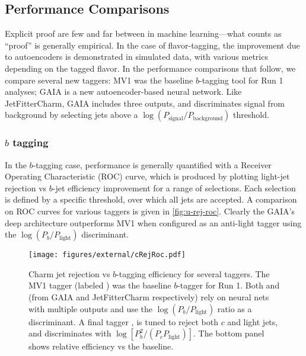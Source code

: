 \subsection{Performance Comparisons}

Explicit proof are few and far between in machine learning---what counts as ``proof'' is generally empirical.
In the case of flavor-tagging, the improvement due to autoencoders is demonstrated in simulated data, with various metrics depending on the tagged flavor.
In the performance comparisons that follow, we compare several new taggers: MV1 was the baseline $b$-tagging tool for Run 1 analyses; GAIA is a new autoencoder-based neural network.
Like JetFitterCharm, GAIA includes three outputs, and discriminates signal from background by selecting jets above a $\log(P_{\text{signal}} / P_{\text{background}})$ threshold.

\subsubsection{$b$ tagging}
In the $b$-tagging case, performance is generally quantified with a Receiver Operating Characteristic (ROC) curve, which is produced by plotting light-jet rejection vs $b$-jet efficiency improvement for a range of selections. Each selection is defined by a specific threshold, over which all jets are accepted.
A comparison on ROC curves for various taggers is given in \cref{fig:u-rej-roc}.
Clearly the GAIA's deep architecture outperforms MV1 when configured as an anti-light tagger using the $\log(P_{b}/P_{\text{light}})$ discriminant.

\begin{figure}
  \begin{center}
    \texttt{[image: figures/external/cRejRoc.pdf]}
    \caption[Charm jet rejection as a function of $b$-tagging efficiency]{Charm jet rejection vs $b$-tagging efficiency for several taggers. The MV1 tagger (labeled ) was the baseline $b$-tagger for Run 1. Both  and  (from  GAIA and JetFitterCharm respectively) rely on neural nets with multiple outputs and use the $\log (P_{b} / P_{\text{light}})$ ratio as a discriminant. A final tagger , is tuned to reject both $c$ and light jets, and discriminates with $\log [P_{b}^2 / (P_{c} P_{\text{light}})]$.  The bottom panel shows relative efficiency vs the  baseline.}
    \label{fig:c-rej-roc}
  \end{center}
\end{figure}

